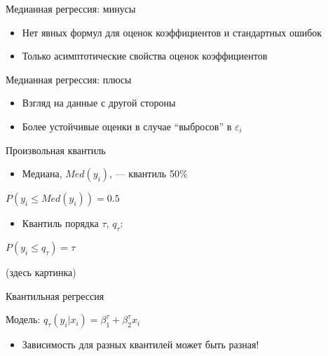 \documentclass[ignorenonframetext,]{beamer}
\newcommand{\e}{\varepsilon}
\begin{document}
\begin{frame}{Медианная регрессия: минусы}

\begin{itemize}
\item
  Нет явных формул для оценок коэффициентов и стандартных ошибок
\item
  Только асимптотические свойства оценок коэффициентов
\end{itemize}

\end{frame}

\begin{frame}{Медианная регрессия: плюсы}

\begin{itemize}
\item
  Взгляд на данные с другой стороны
\item
  Более устойчивые оценки в случае ``выбросов'' в \(\e_i\)
\end{itemize}

\end{frame}

\begin{frame}{Произвольная квантиль}

\begin{itemize}
\itemsep1pt\parskip0pt
\item
  Медиана, \(Med(y_i)\), --- квантиль 50\%
\end{itemize}

\(P(y_i \leq Med(y_i))=0.5\)

\begin{itemize}
\itemsep1pt\parskip0pt
\item
  Квантиль порядка \(\tau\), \(q_{\tau}\):
\end{itemize}

\(P(y_i \leq q_{\tau})=\tau\)

(здесь картинка)

\end{frame}

\begin{frame}{Квантильная регрессия}

Модель: \(q_{\tau}(y_i|x_i)=\beta_1^{\tau} + \beta_2^{\tau} x_i\)

\begin{itemize}
\itemsep1pt\parskip0pt
\item
  Зависимость для разных квантилей может быть разная!
\end{itemize}

\end{frame}
\end{document}
